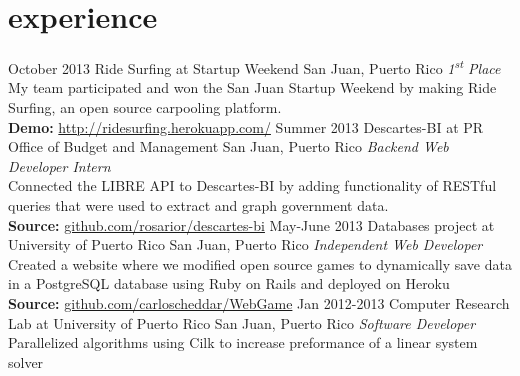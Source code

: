 \documentclass[]{friggeri-cv} %
\begin{document}

\section{experience}

\begin{entrylist}
\entry
{\footnotesize October 2013}
{Ride Surfing at Startup Weekend}
{San Juan, Puerto Rico}
{\small \emph{1\textsuperscript{st} Place} \\
\small My team participated and won the San Juan Startup Weekend by making Ride Surfing, an open source
carpooling platform. \\
\small {\bf Demo:} \href{http://ridesurfing.herokuapp.com/}{http://ridesurfing.herokuapp.com/}}
\entry
{\footnotesize Summer 2013}
{Descartes-BI at PR Office of Budget and Management}
{San Juan, Puerto Rico}
{\small \emph{Backend Web Developer Intern} \\
\small Connected the LIBRE API to Descartes-BI by adding functionality of RESTful queries that were used to extract and graph government data.\\
\small {\bf Source:} \href{https://github.com/rosarior/descartes-bi}{github.com/rosarior/descartes-bi}}
\entry
{\footnotesize May-June 2013}
{Databases project at University of Puerto Rico}
{San Juan, Puerto Rico}
{\small \emph{Independent Web Developer} \\
\small Created a website where we modified open source games to dynamically save
data in a PostgreSQL database using Ruby on Rails and deployed on Heroku \\
\small {\bf Source:} \href{https://github.com/carloscheddar/WebGame}{github.com/carloscheddar/WebGame}}
\entry
{\footnotesize Jan 2012-2013}
{Computer Research Lab at University of Puerto Rico}
{San Juan, Puerto Rico}
{\small \emph{Software Developer} \\
\small Parallelized algorithms using Cilk to increase preformance of a linear system solver}
\end{entrylist}

\end{document}
